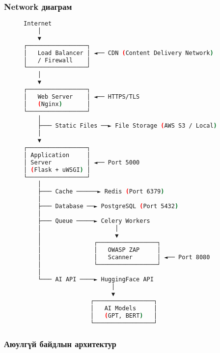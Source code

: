 \documentclass[main.tex]{subfiles}
\begin{document}
\subsubsection{Network диаграм}

\begin{figure}[h]
\centering
\begin{lstlisting}[language=bash, caption=Системийн сүлжээний диаграм]
Internet
    │
    ▼
┌─────────────────┐
│   Load Balancer │ ◄── CDN (Content Delivery Network)
│   / Firewall    │
└─────────────────┘
    │
    ▼
┌─────────────────┐
│   Web Server    │ ◄── HTTPS/TLS
│   (Nginx)       │
└─────────────────┘
    │
    ├─── Static Files ──► File Storage (AWS S3 / Local)
    │
    ▼
┌─────────────────┐
│ Application     │
│ Server          │ ◄── Port 5000
│ (Flask + uWSGI) │
└─────────────────┘
    │
    ├─── Cache ──────► Redis (Port 6379)
    │
    ├─── Database ──► PostgreSQL (Port 5432)
    │
    ├─── Queue ─────► Celery Workers
    │                     │
    │                     ▼
    │               ┌─────────────────┐
    │               │   OWASP ZAP     │
    │               │   Scanner       │ ◄── Port 8080
    │               └─────────────────┘
    │
    └─── AI API ────► HuggingFace API
                         │
                         ▼
                   ┌─────────────────┐
                   │   AI Models     │
                   │   (GPT, BERT)   │
                   └─────────────────┘
\end{lstlisting}
\end{figure}

\subsubsection{Аюулгүй байдлын архитектур}
\end{document}
